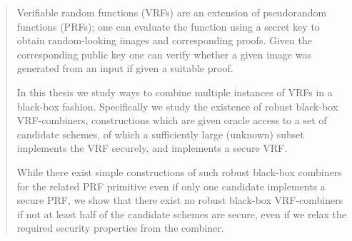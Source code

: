 \begin{abstract}
    Verifiable random functions (VRFs) are an extension of pseudorandom functions (PRFs);
    one can evaluate the function using a secret key to obtain random-looking images and corresponding proofs.
    Given the corresponding public key one can verify whether a given image was generated from an input 
    if given a suitable proof.

    In this thesis we study ways to combine multiple instances of VRFs in a black-box fashion. 
    Specifically we study the existence of robust black-box VRF-combiners, constructions which are given oracle access 
    to a set of candidate schemes, of which a sufficiently large (unknown) subset implements the VRF securely,
    and implements a secure VRF.

    While there exist simple constructions of such robust black-box combiners for the related PRF 
    primitive even if only one candidate implements a secure PRF, we show that there exist no robust black-box VRF-combiners if not at least half of the
    candidate schemes are secure, even if we relax the required security properties from the combiner.
\end{abstract}